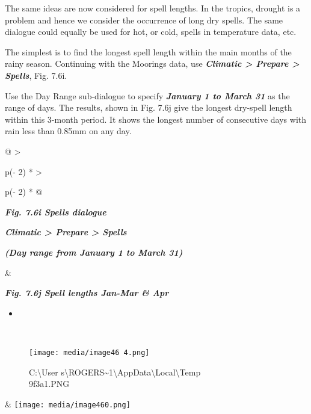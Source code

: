 \documentclass[
  letterpaper,
  DIV=11,
  numbers=noendperiod]{scrreprt}
\providecommand{\tightlist}{%
  \setlength{\itemsep}{0pt}\setlength{\parskip}{0pt}}\usepackage{longtable,booktabs,array}
\begin{document}
The same ideas are now considered for spell lengths. In the tropics,
drought is a problem and hence we consider the occurrence of long dry
spells. The same dialogue could equally be used for hot, or cold, spells
in temperature data, etc.

The simplest is to find the longest spell length within the main months
of the rainy season. Continuing with the Moorings data, use
\textbf{\emph{Climatic \textgreater{} Prepare \textgreater{} Spells}},
Fig. 7.6i.

Use the Day Range sub-dialogue to specify \textbf{\emph{January 1 to
March 31}} as the range of days. The results, shown in Fig. 7.6j give
the longest dry-spell length within this 3-month period. It shows the
longest number of consecutive days with rain less than 0.85mm on any
day.

\begin{longtable}[]{@{}
  >{\raggedright\arraybackslash}p{(\columnwidth - 2\tabcolsep) * }
  >{\raggedright\arraybackslash}p{(\columnwidth - 2\tabcolsep) * }@{}}
\toprule\noalign{}
\begin{minipage}[b]{\linewidth}\raggedright
\textbf{\emph{Fig. 7.6i Spells dialogue}}

\textbf{\emph{Climatic \textgreater{} Prepare \textgreater{} Spells}}

\textbf{\emph{(Day range from January 1 to March 31)}}
\end{minipage} & \begin{minipage}[b]{\linewidth}\raggedright
\textbf{\emph{Fig. 7.6j Spell lengths Jan-Mar \& Apr}}

\begin{itemize}
\tightlist
\item
\end{itemize}
\end{minipage} \\
\midrule\noalign{}
\endhead
\bottomrule\noalign{}
\endlastfoot
\begin{minipage}[t]{\linewidth}\raggedright
\begin{figure}[H]

{\centering \texttt{[image: media/image46 4.png]}

}

\caption{C:\textbackslash User
s\textbackslash ROGERS\textasciitilde1\textbackslash AppData\textbackslash Local\textbackslash Temp\\
\SNAGHTMLac9f3a1.PNG}

\end{figure}%
\end{minipage} &
\texttt{[image: media/image460.png]} \\
\end{longtable}
\end{document}
